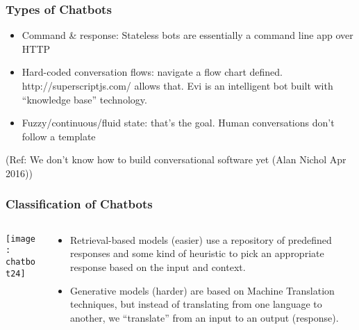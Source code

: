 \begin{frame}[fragile]\frametitle{Types of Chatbots}
\begin{itemize}
\item Command \& response: Stateless bots are essentially a command line app over HTTP
\item Hard-coded conversation flows: navigate a flow chart defined. http://superscriptjs.com/ allows that. Evi is an intelligent bot built with ``knowledge base'' technology.
\item Fuzzy/continuous/fluid state: that's the goal. Human conversations don't follow a template
\end{itemize}

{\tiny (Ref: We don't know how to build conversational software yet (Alan Nichol Apr 2016))}
\end{frame}

\begin{frame}[fragile]\frametitle{Classification of Chatbots}
    \begin{columns}
    \begin{column}[t]{0.5\linewidth}
	
\begin{center}
\texttt{[image: chatbot24]}
\end{center}
    \end{column}
    \begin{column}[t]{0.5\linewidth}

\begin{itemize}
\item Retrieval-based models (easier) use a repository of predefined responses and some kind of heuristic to pick an appropriate response based on the input and context. 
\item Generative models (harder) are based on Machine Translation techniques, but instead of translating from one language to another, we ``translate'' from an input to an output (response).
\end{itemize}
    \end{column}
    \end{columns}

\end{frame}





